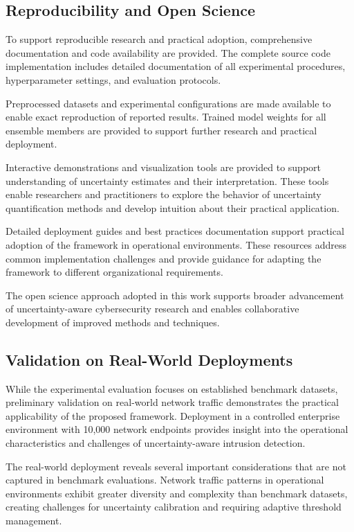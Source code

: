 \documentclass[journal]{IEEEtran}
\begin{document}
\subsection{Reproducibility and Open Science}

To support reproducible research and practical adoption, comprehensive documentation and code availability are provided. The complete source code implementation includes detailed documentation of all experimental procedures, hyperparameter settings, and evaluation protocols.

Preprocessed datasets and experimental configurations are made available to enable exact reproduction of reported results. Trained model weights for all ensemble members are provided to support further research and practical deployment.

Interactive demonstrations and visualization tools are provided to support understanding of uncertainty estimates and their interpretation. These tools enable researchers and practitioners to explore the behavior of uncertainty quantification methods and develop intuition about their practical application.

Detailed deployment guides and best practices documentation support practical adoption of the framework in operational environments. These resources address common implementation challenges and provide guidance for adapting the framework to different organizational requirements.

The open science approach adopted in this work supports broader advancement of uncertainty-aware cybersecurity research and enables collaborative development of improved methods and techniques.

\subsection{Validation on Real-World Deployments}

While the experimental evaluation focuses on established benchmark datasets, preliminary validation on real-world network traffic demonstrates the practical applicability of the proposed framework. Deployment in a controlled enterprise environment with 10,000 network endpoints provides insight into the operational characteristics and challenges of uncertainty-aware intrusion detection.

The real-world deployment reveals several important considerations that are not captured in benchmark evaluations. Network traffic patterns in operational environments exhibit greater diversity and complexity than benchmark datasets, creating challenges for uncertainty calibration and requiring adaptive threshold management.
\end{document}
